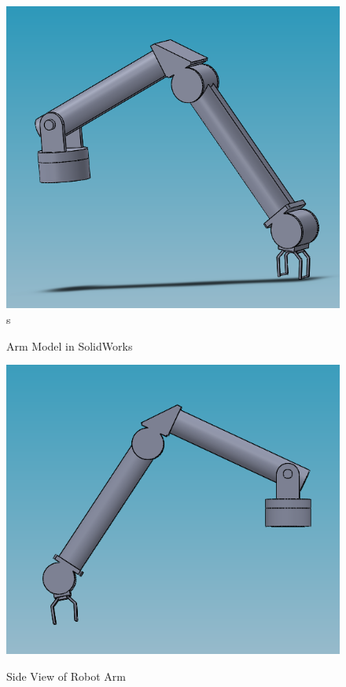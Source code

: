 \begin{figure}[H]
	\centering
	\includegraphics[scale=0.45]{sections/robot-design/images/arm_model.png}s
	\label{sample_return_rover:robot_design:arm_model}
	\caption{Arm Model in SolidWorks}
\end{figure}

\begin{figure}[H]
	\centering
	\includegraphics[scale=0.50]{sections/robot-design/images/arm_side.png}
	\label{sample_return_rover:robot_design:arm_side}
	\caption{Side View of Robot Arm}
\end{figure}
